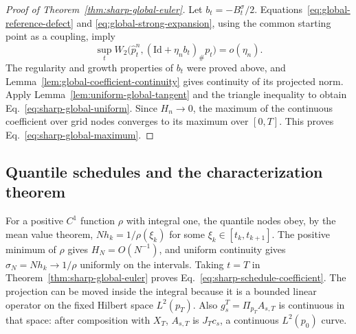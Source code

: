 \begin{proof}[Proof of Theorem~\ref{thm:sharp-global-euler}]
Let $b_t=-B_t^\sigma/2$.  Equations~\eqref{eq:global-reference-defect}
and \eqref{eq:global-strong-expansion}, using the common starting point
as a coupling, imply
\[
 \sup_tW_2\bigl(\widehat p_t^n,
              (\mathrm{Id}+\eta_nb_t)_\#p_t\bigr)=o(\eta_n).
\]
The regularity and growth properties of $b_t$ were proved above, and
Lemma~\ref{lem:global-coefficient-continuity} gives continuity of its
projected norm.  Apply Lemma~\ref{lem:uniform-global-tangent} and the
triangle inequality to obtain Eq.~\eqref{eq:sharp-global-uniform}.
Since $H_n\to0$, the maximum of the continuous coefficient over grid
nodes converges to its maximum over $[0,T]$.  This proves
Eq.~\eqref{eq:sharp-global-maximum}.
\end{proof}

\subsection{Quantile schedules and the characterization theorem}

For a positive $C^1$ function $\rho$ with integral one, the quantile
nodes obey, by the mean value theorem,
$Nh_k=1/\rho(\xi_k)$ for some $\xi_k\in[t_k,t_{k+1}]$.
The positive minimum of $\rho$ gives $H_N=O(N^{-1})$, and uniform
continuity gives $\sigma_N=Nh_k\to1/\rho$ uniformly on the intervals.
Taking $t=T$ in Theorem~\ref{thm:sharp-global-euler} proves
Eq.~\eqref{eq:sharp-schedule-coefficient}.  The projection can be moved
inside the integral because it is a bounded linear operator on the
fixed Hilbert space $L^2(p_T)$.  Also
$g_s^T=\Pi_{p_T}A_{s,T}$ is continuous in that space: after composition
with $X_T$, $A_{s,T}$ is $J_Tc_s$, a continuous $L^2(p_0)$ curve.


